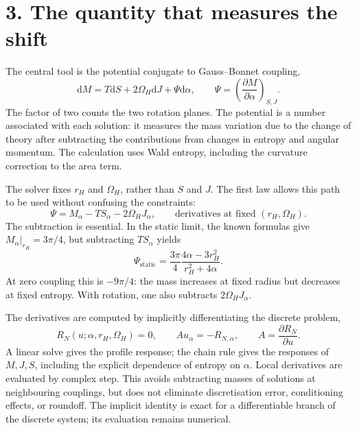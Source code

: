 \documentclass[11pt,a4paper]{article}
\newcommand{\dd}{\mathrm{d}}
\begin{document}
\newpage
\section*{3. The quantity that measures the shift}
The central tool is the potential conjugate to Gauss--Bonnet coupling,
\begin{equation}
 \dd M=T\dd S+2\Omega_H\dd J+\Psi\dd\alpha,
 \qquad \Psi=\left(\frac{\partial M}{\partial\alpha}\right)_{S,J}.
 \label{eq:firstlaw}
\end{equation}
The factor of two counts the two rotation planes. The potential is a number associated with each solution: it measures the mass variation due to the change of theory after subtracting the contributions from changes in entropy and angular momentum. The calculation uses Wald entropy, including the curvature correction to the area term.

The solver fixes $r_H$ and $\Omega_H$, rather than $S$ and $J$. The first law allows this path to be used without confusing the constraints:
\begin{equation}
 \boxed{\Psi=M_\alpha-T S_\alpha-2\Omega_H J_\alpha,}
 \qquad \text{derivatives at fixed }(r_H,\Omega_H).
 \label{eq:response}
\end{equation}
The subtraction is essential. In the static limit, the known formulas give $M_\alpha|_{r_H}=3\pi/4$, but subtracting $T S_\alpha$ yields
\begin{equation}
 \Psi_{\mathrm{static}}=\frac{3\pi}{4}\frac{4\alpha-3r_H^2}{r_H^2+4\alpha}.
\end{equation}
At zero coupling this is $-9\pi/4$: the mass increases at fixed radius but decreases at fixed entropy. With rotation, one also subtracts $2\Omega_HJ_\alpha$.

The derivatives are computed by implicitly differentiating the discrete problem,
\begin{equation}
 R_N(u;\alpha,r_H,\Omega_H)=0,
 \qquad
 A u_\alpha=-R_{N,\alpha},\qquad A=\frac{\partial R_N}{\partial u}.
\end{equation}
A linear solve gives the profile response; the chain rule gives the responses of $M,J,S$, including the explicit dependence of entropy on $\alpha$. Local derivatives are evaluated by complex step. This avoids subtracting masses of solutions at neighbouring couplings, but does not eliminate discretisation error, conditioning effects, or roundoff. The implicit identity is exact for a differentiable branch of the discrete system; its evaluation remains numerical.
\end{document}
